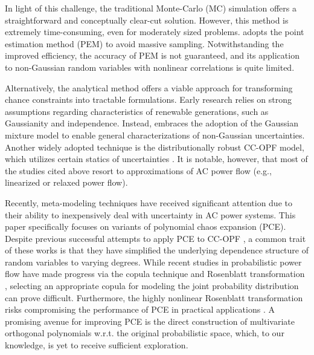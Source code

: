 \documentclass[journal]{IEEEtran}
\theoremstyle{definition}
\theoremstyle{remark}
\begin{document}
In light of this challenge, the traditional Monte-Carlo (MC) simulation \cite{zhang2010probabilistic} offers a straightforward and conceptually clear-cut solution. However, this method is extremely time-consuming, even for moderately sized problems. \cite{du2021chance} adopts the point estimation method (PEM) to avoid massive sampling. Notwithstanding the improved efficiency, the accuracy of PEM is not guaranteed, and its application to non-Gaussian random variables with nonlinear correlations is quite limited. 

Alternatively, the analytical method offers a viable approach for transforming chance constraints into tractable formulations. Early research relies on strong assumptions regarding characteristics of renewable generations, such as Gaussianity and independence. Instead, \cite{yang2020analytical} embraces the adoption of the Gaussian mixture model to enable general characterizations of non-Gaussian uncertainties. Another widely adopted technique is the distributionally robust CC-OPF model, which utilizes certain statics of uncertainties \cite{roald2018chance,li2019distribution,arab2022distributionally,arrigo2022embed}. It is notable, however, that most of the studies cited above resort to approximations of AC power flow (e.g., linearized or relaxed power flow).

Recently, meta-modeling techniques have received significant attention due to their ability to inexpensively deal with uncertainty in AC power systems. This paper specifically focuses on variants of polynomial chaos expansion (PCE). Despite previous successful attempts to apply PCE to CC-OPF \cite{li2018compressive,muhlpfordt2019chance,metivier2020efficient,xu2021iterative}, a common trait of these works is that they have simplified the underlying dependence structure of random variables to varying degrees.
While recent studies in probabilistic power flow have made progress via the copula technique and Rosenblatt transformation
 \cite{ye2022generalized,ly2022scalable}, selecting an appropriate copula for modeling the joint probability distribution can prove difficult. Furthermore, the highly nonlinear Rosenblatt transformation risks compromising the performance of PCE in practical applications \cite{lee2022reliability}. A promising avenue for improving PCE is the direct construction of multivariate orthogonal polynomials w.r.t. the original probabilistic space, which, to our knowledge, is yet to receive sufficient exploration.
\end{document}

